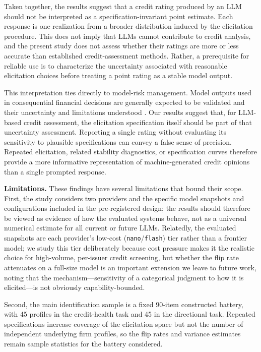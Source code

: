 \documentclass[pdflatex,sn-nature,lineno]{sn-jnl}
\theoremstyle{thmstyleone}
\begin{document}
Taken together, the results suggest that a credit rating produced by an LLM should not be interpreted as a
specification-invariant point estimate. Each response is one realization from a broader distribution induced
by the elicitation procedure. This does not imply that LLMs cannot contribute to credit analysis, and the
present study does not assess whether their ratings are more or less accurate than established
credit-assessment methods. Rather, a prerequisite for reliable use is to characterize the uncertainty
associated with reasonable elicitation choices before treating a point rating as a stable model output.

This interpretation ties directly to model-risk management. Model outputs used in consequential financial
decisions are generally expected to be validated and their uncertainty and limitations understood
\cite{srletter2011}. Our results suggest that, for LLM-based credit assessment, the elicitation
specification itself should be part of that uncertainty assessment. Reporting a single rating without
evaluating its sensitivity to plausible specifications can convey a false sense of precision. Repeated
elicitation, related stability diagnostics, or specification curves therefore provide a more informative
representation of machine-generated credit opinions than a single prompted response.

\noindent\textbf{Limitations.} These findings have several limitations that bound their scope. First, the study considers two providers
and the specific model snapshots and configurations included in the pre-registered design; the
results should therefore be viewed as evidence of how the evaluated systems behave, not as a universal
numerical estimate for all current or future LLMs. Relatedly, the evaluated snapshots are each provider's
low-cost (\texttt{nano}/\texttt{flash}) tier rather than a frontier model; we study this tier deliberately
because cost pressure makes it the realistic choice for high-volume, per-issuer credit screening, but
whether the flip rate attenuates on a full-size model is an important extension we leave to future work,
noting that the mechanism---sensitivity of a categorical judgment to how it is elicited---is not obviously
capability-bounded.

Second, the main identification sample is a fixed 90-item constructed battery, with 45 profiles in the
credit-health task and 45 in the directional task. Repeated specifications increase coverage of the
elicitation space but not the number of independent underlying firm profiles, so the flip rates and
variance estimates remain sample statistics for the battery considered.
\end{document}
